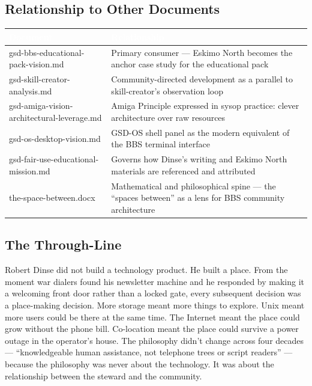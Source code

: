 \documentclass[11pt,letterpaper]{article}
\newcommand{\tableheader}[1]{\textbf{\sffamily\textcolor{white}{#1}}}
\begin{document}
\subsection{Relationship to Other Documents}

\begin{center}
\begin{tabularx}{\textwidth}{L{5cm}X}
\toprule
{}
\tableheader{Document} & \tableheader{Relationship} \\
\midrule
gsd-bbs-educational-pack-vision.md & Primary consumer --- Eskimo North becomes the anchor case study for the educational pack \\
gsd-skill-creator-analysis.md & Community-directed development as a parallel to skill-creator's observation loop \\
gsd-amiga-vision-architectural-leverage.md & Amiga Principle expressed in sysop practice: clever architecture over raw resources \\
gsd-os-desktop-vision.md & GSD-OS shell panel as the modern equivalent of the BBS terminal interface \\
gsd-fair-use-educational-mission.md & Governs how Dinse's writing and Eskimo North materials are referenced and attributed \\
the-space-between.docx & Mathematical and philosophical spine --- the ``spaces between'' as a lens for BBS community architecture \\
\bottomrule
\end{tabularx}
\end{center}

\subsection{The Through-Line}

Robert Dinse did not build a technology product. He built a place. From the moment war dialers found his newsletter machine and he responded by making it a welcoming front door rather than a locked gate, every subsequent decision was a place-making decision. More storage meant more things to explore. Unix meant more users could be there at the same time. The Internet meant the place could grow without the phone bill. Co-location meant the place could survive a power outage in the operator's house. The philosophy didn't change across four decades --- ``knowledgeable human assistance, not telephone trees or script readers'' --- because the philosophy was never about the technology. It was about the relationship between the steward and the community.
\end{document}

